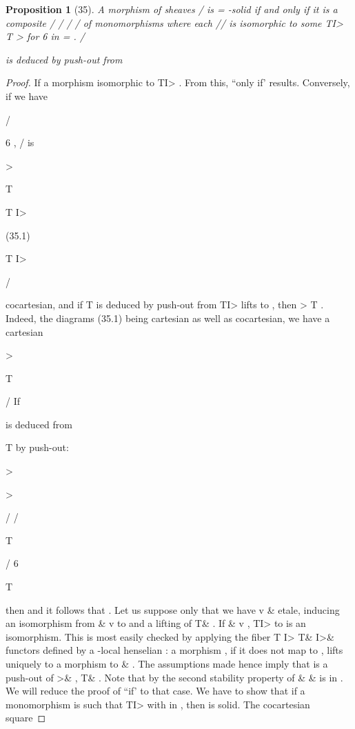 \documentclass[11pt,a4paper]{article}
\theoremstyle{plain}
\newtheorem{proposition}[theorem]{Proposition}
\theoremstyle{definition}
\begin{document}
\begin{proposition}[35]
A morphism of sheaves  /
is = -solid if and only if it is
a composite /
/ /
/
of monomorphisms where each
//  is isomorphic to some TI> T > for   6 in = .
/



is deduced by push-out from
\end{proposition}

\begin{proof} If a morphism
isomorphic to TI> . From this, ``only if' results. Conversely, if we have

/ 




 

6 , / is


  

  
>

T

 

T I>

(35.1)

T I>

/

cocartesian, and if T
is deduced by push-out from
TI> lifts to , then
>
T . Indeed, the diagrams (35.1) being cartesian as well as cocartesian, we
have a cartesian

  


>

T

/ 
If

 is deduced from

T by push-out:

>




>













/ 
/

T

/
 6 




T

then  
and it follows that 
.
Let us suppose only that we have v \&
etale, inducing an isomorphism
from \&  v
to  and a lifting of T\&
. If \&
v
,
TI> to
is
an
isomorphism.
This
is
most
easily
checked
by
applying
the
fiber
T I>
T\& I>\&
functors defined by a -local henselian : a morphism
, if it does not map
to , lifts uniquely to a morphism to \& . The assumptions made hence imply that
is a push-out of >\&
,
T\& . Note that by the second stability property of
\& \& is in .
We will reduce the proof of ``if' to that case. We have to show that if a monomorphism
is such that
 TI> with
in , then is solid.
The cocartesian square


\end{proof}
\end{document}

